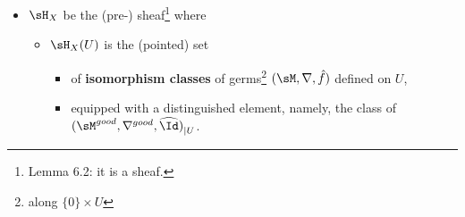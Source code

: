\begin{defn}
\begin{itemize}
    \item $\sH_X$ be the (pre-) sheaf\footnote{Lemma 6.2: it is a sheaf.} where
      \begin{itemize}
        \item $\sH_X(U)$ is the (pointed) set
          \begin{itemize}
            \item of \textbf{isomorphism classes} of
              germs\footnote{along $\{0\}\times U$}
              $(\sM,\nabla,\hat f)$ defined on $U$,
              \begin{comment}
                \begin{itemize}
                  \item Why germs??
                  \item along $\{0\}\times U$??
                \end{itemize}
              \end{comment}
            \item equipped with a distinguished element, namely, the class of
              ${(\sM^{good},\nabla^{good},\widehat{\Id})}_{|U}$.
          \end{itemize}
      \end{itemize}
  \end{itemize}
\end{defn}

